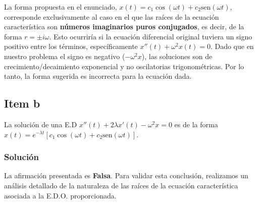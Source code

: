 \documentclass[a4paper]{article}
\begin{document}
La forma propuesta en el enunciado, $x(t)= c_1 \cos(\omega t)+ c_2 \text{sen}(\omega t)$, corresponde exclusivamente al caso en el que las raíces de la ecuación característica son \textbf{números imaginarios puros conjugados}, es decir, de la forma $r = \pm i\omega$. Esto ocurriría si la ecuación diferencial original tuviera un signo positivo entre los términos, específicamente $x''(t) + \omega^2 x(t) = 0$. Dado que en nuestro problema el signo es negativo ($-\omega^2 x$), las soluciones son de crecimiento/decaimiento exponencial y no oscilatorias trigonométricas. Por lo tanto, la forma sugerida es incorrecta para la ecuación dada.

\subsection{Item b}
La solución de una E.D $x''(t)+ 2\lambda x'(t) - \omega^2 x = 0$ es de la forma $x(t)= e^{-\lambda t}[c_1 \cos(\omega t)+ c_2 \text{sen}(\omega t)]$.

\subsubsection{Solución}
La afirmación presentada es \textbf{Falsa}. Para validar esta conclusión, realizamos un análisis detallado de la naturaleza de las raíces de la ecuación característica asociada a la E.D.O. proporcionada.
\end{document}
